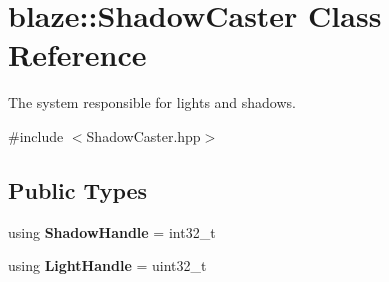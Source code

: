 \hypertarget{classblaze_1_1ShadowCaster}{}\section{blaze\+:\+:Shadow\+Caster Class Reference}
\label{classblaze_1_1ShadowCaster}


The system responsible for lights and shadows.  




{\ttfamily \#include $<$Shadow\+Caster.\+hpp$>$}

\subsection*{Public Types}
\begin{DoxyCompactItemize}
\item 
\mbox{\label{classblaze_1_1ShadowCaster_a9fb8de1f0c42124b22d81da9f34dbd4d}} 
using {\bfseries Shadow\+Handle} = int32\+\_\+t
\item 
\mbox{\label{classblaze_1_1ShadowCaster_a04974f5d9bc5bbca4da546f6a3b59805}} 
using {\bfseries Light\+Handle} = uint32\+\_\+t
\end{DoxyCompactItemize}
